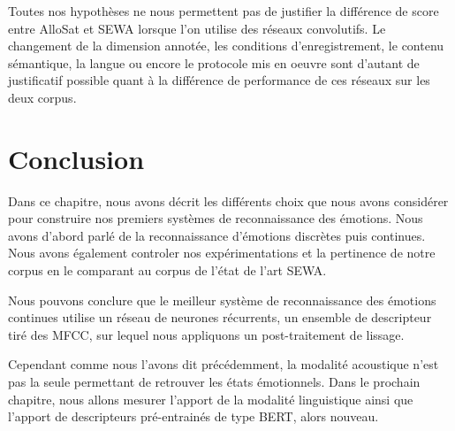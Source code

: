 Toutes nos hypothèses ne nous permettent pas de justifier la différence de score entre AlloSat et SEWA lorsque l'on utilise des réseaux convolutifs. Le changement de la dimension annotée, les conditions d'enregistrement, le contenu sémantique, la langue ou encore le protocole mis en oeuvre sont d'autant de justificatif possible quant à la différence de performance de ces réseaux sur les deux corpus.

\section{Conclusion}
Dans ce chapitre, nous avons décrit les différents choix que nous avons considérer pour construire nos premiers systèmes de reconnaissance des émotions. Nous avons d'abord parlé de la reconnaissance d'émotions discrètes puis continues. Nous avons également controler nos expérimentations et la pertinence de notre corpus en le comparant au corpus de l'état de l'art SEWA.

Nous pouvons conclure que le meilleur système de reconnaissance des émotions continues utilise un réseau de neurones récurrents, un ensemble de descripteur tiré des MFCC, sur lequel nous appliquons un post-traitement de lissage.

Cependant comme nous l'avons dit précédemment, la modalité acoustique n'est pas la seule permettant de retrouver les états émotionnels. Dans le prochain chapitre, nous allons mesurer l'apport de la modalité linguistique ainsi que l'apport de descripteurs pré-entrainés de type BERT, alors nouveau.

